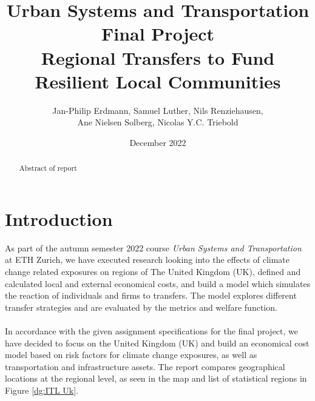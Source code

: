 \documentclass[10pt,a4]{article}
\title{\vspace{.0cm}Urban Systems and Transportation \\ Final Project \vspace{5cm}\\ \textbf{Regional Transfers to Fund Resilient Local Communities}\vspace{1 cm}}
\author{Jan-Philip Erdmann, Samuel Luther, Nils Renziehausen, \\Ane Nielsen Solberg, Nicolas Y.C. Triebold\vspace{1cm}}
\date{December 2022}
\begin{document}
\maketitle
\newpage
{}


\begin{abstract}
Abstract of report
\end{abstract}
\section{Introduction}
As part of the autumn semester 2022 course \textit{Urban Systems and Transportation}\cite{course} at ETH Zurich, we have executed research looking into the effects of climate change related exposures on regions of The United Kingdom (UK), defined and calculated local and external economical costs, and build a model which simulates the reaction of individuals and firms to transfers. The model explores different transfer strategies and are evaluated by the metrics and welfare function. \\\\
In accordance with the given assignment specifications for the final project, we have decided to focus on the United Kingdom (UK) and build an economical cost model based on risk factors for climate change exposures, as well as transportation and infrastructure assets. The report compares geographical locations at the regional level, as seen in the map and list of statistical regions in Figure \ref{dg:ITL Uk}.\\
\end{document}
